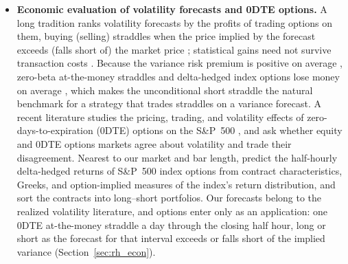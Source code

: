 \begin{itemize}
  \citet{BehrendtSchmidt2018} relate Twitter sentiment and activity to the intraday volatility of individual stocks.
  We ask what such data add to an intraday model of the index's realized variance, next to the futures' own
  realized moments, the trading of the index's constituents, implied volatility, and the FOMC calendar.
\item \textbf{Economic evaluation of volatility forecasts and 0DTE options.} A long tradition ranks volatility
  forecasts by the profits of trading options on them, buying (selling) straddles when the price implied by the
  forecast exceeds (falls short of) the market price \citep{EngleHongKaneNoh1993,NohEngleKane1994,
  BandiRussellYang2008}; statistical gains need not survive transaction costs
  \citep{HarveyWhaley1992,ChanJhaKalimipalli2009}. Because the variance risk premium is positive on average
  \citep{CarrWu2009,BollerslevTauchenZhou2009}, zero-beta at-the-money straddles and delta-hedged index options lose
  money on average \citep{CovalShumway2001,BakshiKapadia2003}, which makes the unconditional short straddle the
  natural benchmark for a strategy that trades straddles on a variance forecast. A recent literature studies the
  pricing, trading, and volatility effects of zero-days-to-expiration (0DTE) options on the S\&P~500
  \citep{BandiFusariReno2023,BeckmeyerBrangerGayda2023,DimErakerVilkov2024}, and \citet{ChongTodorov2026} ask
  whether equity and 0DTE options markets agree about volatility and trade their disagreement. Nearest to our market
  and bar length, \citet{MaischZhangUlrichZimmer2026} predict the half-hourly delta-hedged returns of S\&P~500 index
  options from contract characteristics, Greeks, and option-implied measures of the index's return distribution,
  and sort the contracts into long--short portfolios. Our forecasts belong to the realized volatility literature,
  and options enter only as an application: one 0DTE at-the-money straddle a day through the closing half hour,
  long or short as the forecast for that interval exceeds or falls short of the implied variance
  (Section~\ref{sec:rh_econ}).
\end{itemize}

